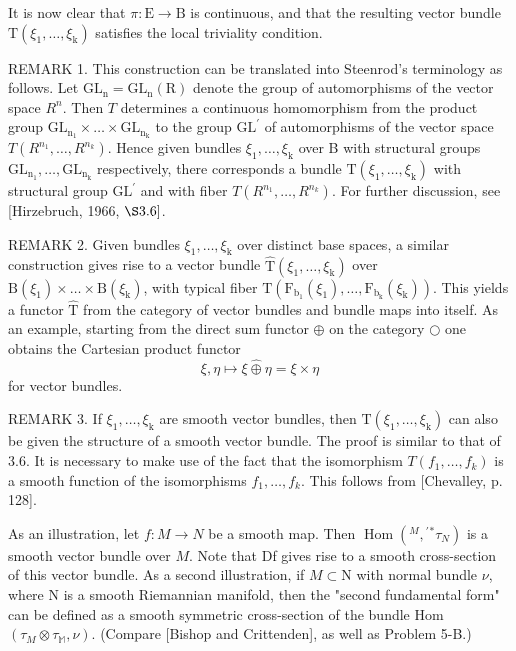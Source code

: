 \documentclass[10pt]{article}
\begin{document}
It is now clear that $\pi: \mathrm{E} \rightarrow \mathrm{B}$ is continuous, and that the resulting vector bundle $\mathrm{T}\left(\xi_{1}, \ldots, \xi_{\mathrm{k}}\right)$ satisfies the local triviality condition.

REMARK 1. This construction can be translated into Steenrod's terminology as follows. Let $\mathrm{GL}_{\mathrm{n}}=\mathrm{GL}_{\mathrm{n}}(\mathrm{R})$ denote the group of automorphisms of the vector space $R^{n}$. Then $T$ determines a continuous homomorphism from the product group $\mathrm{GL}_{\mathrm{n}_{1}} \times \ldots \times \mathrm{GL}_{\mathrm{n}_{\mathrm{k}}}$ to the group $\mathrm{GL}^{\prime}$ of automorphisms of the vector space $T\left(R^{n_{1}}, \ldots, R^{n_{k}}\right)$. Hence given bundles $\xi_{1}, \ldots, \xi_{\mathrm{k}}$ over B with structural groups $\mathrm{GL}_{\mathrm{n}_{1}}, \ldots, \mathrm{GL}_{\mathrm{n}_{\mathrm{k}}}$ respectively, there corresponds a bundle $\mathrm{T}\left(\xi_{1}, \ldots, \xi_{\mathrm{k}}\right)$ with structural group $\mathrm{GL}^{\prime}$ and with fiber $T\left(R^{n_{1}}, \ldots, R^{n_{k}}\right)$. For further discussion, see [Hirzebruch, 1966, $\S 3.6]$.

REMARK 2. Given bundles $\xi_{1}, \ldots, \xi_{\mathrm{k}}$ over distinct base spaces, a similar construction gives rise to a vector bundle $\widehat{\mathrm{T}}\left(\xi_{1}, \ldots, \xi_{\mathrm{k}}\right)$ over $\mathrm{B}\left(\xi_{1}\right) \times \ldots \times \mathrm{B}\left(\xi_{\mathrm{k}}\right)$, with typical fiber $\mathrm{T}\left(\mathrm{F}_{\mathrm{b}_{1}}\left(\xi_{1}\right), \ldots, \mathrm{F}_{\mathrm{b}_{\mathrm{k}}}\left(\xi_{\mathrm{k}}\right)\right)$. This yields a functor $\hat{\mathrm{T}}$ from the category of vector bundles and bundle maps into itself. As an example, starting from the direct sum functor $\oplus$ on the category $\bigcirc$ one obtains the Cartesian product functor
$$
\xi, \eta \mapsto \xi \hat{\oplus} \eta=\xi \times \eta
$$
for vector bundles.

REMARK 3. If $\xi_{1}, \ldots, \xi_{\mathrm{k}}$ are smooth vector bundles, then $\mathrm{T}\left(\xi_{1}, \ldots, \xi_{\mathrm{k}}\right)$ can also be given the structure of a smooth vector bundle. The proof is similar to that of 3.6. It is necessary to make use of the fact that the isomorphism $T\left(f_{1}, \ldots, f_{k}\right)$ is a smooth function of the isomorphisms $f_{1}, \ldots, f_{k}$. This follows from [Chevalley, p. 128].

As an illustration, let $f: M \rightarrow N$ be a smooth map. Then $\operatorname{Hom}\left({ }^{M},{ }^{\prime}{ }^{*} \tau_{N}\right)$ is a smooth vector bundle over $M$. Note that Df gives rise to a smooth cross-section of this vector bundle. As a second illustration, if $M \subset \mathrm{N}$ with normal bundle $\nu$, where $\mathrm{N}$ is a smooth Riemannian manifold, then the "second fundamental form" can be defined as a smooth symmetric cross-section of the bundle Hom $\left(\tau_{M} \otimes \tau_{\mathbb{M}}, \nu\right)$. (Compare [Bishop and Crittenden], as well as Problem 5-B.)
\end{document}
